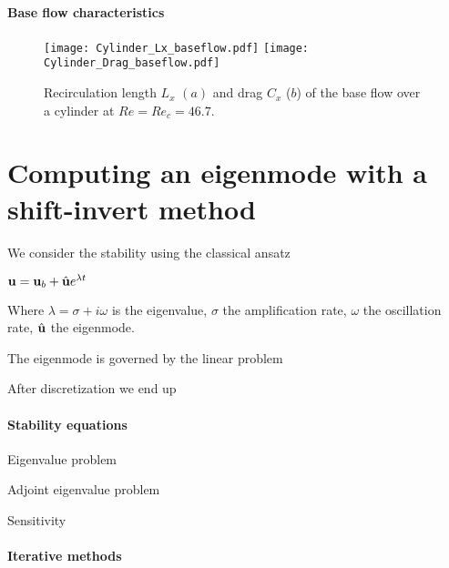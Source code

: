 \documentclass{elsarticle}
\begin{document}
\paragraph{Base flow characteristics}





\begin{figure}
\texttt{[image: Cylinder\_Lx\_baseflow.pdf]}
\texttt{[image: Cylinder\_Drag\_baseflow.pdf]}
\caption{Recirculation length $L_x$ $(a)$  and drag $C_x$ ($b$) of the base flow over a cylinder at $Re=Re_c = 46.7$.}
\label{fig:LxandDrag}
\end{figure}

\clearpage

\section{Computing an eigenmode with a shift-invert method}

We consider the stability using the classical ansatz 

${\bf u} = {\bf u}_b + \hat{{\bf u}} e^{\lambda t}$

Where $\lambda = \sigma + i \omega$ is the eigenvalue, $\sigma$ the amplification rate,
$\omega$ the oscillation rate, $\hat{{\bf u}}$ the eigenmode.

The eigenmode is governed by the linear problem



After discretization we end up 




\paragraph{Stability equations}

Eigenvalue problem

Adjoint eigenvalue problem

Sensitivity

\paragraph{Iterative methods}
\end{document}
